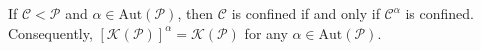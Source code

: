 If $\mathcal{C} < \mathcal{P}$ and $\alpha \in \mathrm{Aut}(\mathcal{P})$, then $\mathcal{C}$ is confined if and only if $\mathcal{C}^\alpha$ is confined. Consequently, $[\mathcal{K}(\mathcal{P})]^\alpha = \mathcal{K}(\mathcal{P})$ for any $\alpha \in \mathrm{Aut}(\mathcal{P})$.
